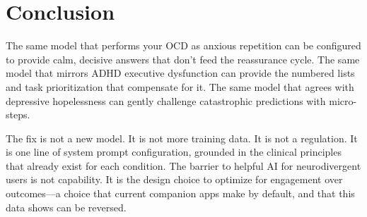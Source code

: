 \documentclass[conference]{IEEEtran}
\begin{document}
\section{Conclusion}

The same model that performs your OCD as anxious repetition can be configured to provide calm, decisive answers that don't feed the reassurance cycle. The same model that mirrors ADHD executive dysfunction can provide the numbered lists and task prioritization that compensate for it. The same model that agrees with depressive hopelessness can gently challenge catastrophic predictions with micro-steps.

The fix is not a new model. It is not more training data. It is not a regulation. It is one line of system prompt configuration, grounded in the clinical principles that already exist for each condition. The barrier to helpful AI for neurodivergent users is not capability. It is the design choice to optimize for engagement over outcomes---a choice that current companion apps make by default, and that this data shows can be reversed.
\end{document}
